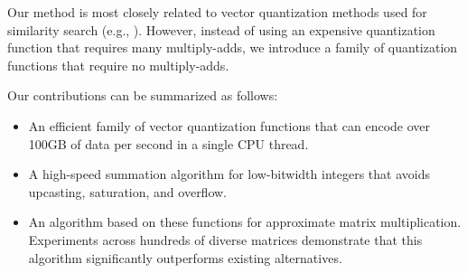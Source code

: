 




Our method is most closely related to vector quantization methods used for similarity search (e.g., \cite{bolt,quickAdc,quickerAdc,pq,opq}). However, instead of using an expensive quantization function that requires many multiply-adds, we introduce a family of quantization functions that require no multiply-adds. %

Our contributions can be summarized as follows:
\vspace{-3mm}
\begin{itemize}\itemsep-1mm
    \item An efficient family of vector quantization functions that can encode over 100GB of data per second in a single CPU thread.
    \item A high-speed summation algorithm for low-bitwidth integers that avoids upcasting, saturation, and overflow.
    \item An algorithm based on these functions for approximate matrix multiplication. Experiments across hundreds of diverse matrices demonstrate that this algorithm significantly outperforms existing alternatives.
\end{itemize}
\vspace{-3mm}

